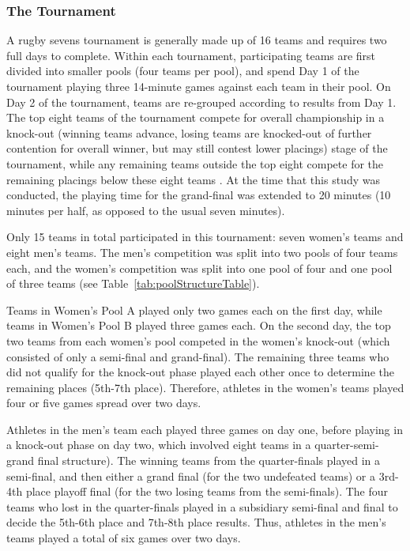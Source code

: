 \begin{CJK}{UTF8}{gbsn}
\subsubsection{The Tournament}
A rugby sevens tournament is generally made up of 16 teams and requires two full days to complete.  Within each tournament, participating teams are first divided into smaller pools (four teams per pool), and spend Day 1 of the tournament playing three 14-minute games against each team in their pool. On Day 2 of the tournament, teams are re-grouped according to results from Day 1.  The top eight teams of the tournament compete for overall championship in a knock-out (winning teams advance, losing teams are knocked-out of further contention for overall winner, but may still contest lower placings) stage of the tournament, while any remaining teams outside the top eight compete for the remaining placings below these eight teams \citep[][]{WorldRugby2018}. At the time that this study was conducted, the playing time for the grand-final was extended to 20 minutes (10 minutes per half, as opposed to the usual seven minutes).

Only 15 teams in total participated in this tournament: seven women's teams and eight men's teams. The men’s competition was split into two pools of four teams each, and the women’s competition was split into one pool of four and one pool of three teams (see Table~\ref{tab:poolStructureTable}).

Teams in Women's Pool A played only two games each on the first day, while teams in Women's Pool B played three games each. On the second day, the top two teams from each women's pool competed in the women's knock-out (which consisted of only a semi-final and grand-final).  The remaining three teams who did not qualify for the knock-out phase played each other once to determine the remaining places (5th-7th place).  Therefore, athletes in the women's teams played four or five games spread over two days.

Athletes in the men's team each played three games on day one, before playing in a knock-out phase on day two, which involved eight teams in a quarter-semi-grand final structure). The winning teams from the quarter-finals played in a semi-final, and then either a grand final (for the two undefeated teams) or a 3rd-4th place playoff final (for the two losing teams from the semi-finals). The four teams who lost in the quarter-finals played in a subsidiary semi-final and final to decide the 5th-6th place and 7th-8th place results. Thus, athletes in the men's teams played a total of six games over two days.



\end{CJK}
